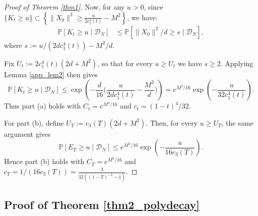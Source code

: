\documentclass[a4paper,11pt]{article}
\theoremstyle{plain}
\theoremstyle{definition}
\begin{document}
\begin{proof}[Proof of Theorem \ref{thm1}]
Now, for any $u>0$, since $\{K_t \geq u\} \subset \left\{\|X_0\|^2 \geq \frac{u}{2c_1^4(t)} - M^2 \right\}$, we have:
\begin{align}
    \mathbb{P}[K_t \geq u \mid \mathcal{D}_N] &\leq \mathbb{P}[\|X_0\|^2/d \geq s \mid \mathcal{D}_N], 
\end{align}
where $s := u/(2dc_1^4(t)) - M^2/d$.

Fix $U_t := 2c_1^4(t)(2d+M^2)$, so that for every $u\ge U_t$ we have $s \ge 2$. Applying Lemma \ref{app_lem2} then gives
\[
\mathbb{P}[K_t \ge u \mid \mathcal{D}_N] \le \exp\!\left(-\frac{d}{16}\Big(\frac{u}{2dc_1^4(t)}-\frac{M^2}{d}\Big)\right)
= e^{M^2/16}\exp\!\left(-\frac{u}{32c_1^4(t)}\right).
\]
Thus part (a) holds with $C_t=e^{M^2/16}$ and $c_t=(1-t)^4/32$.

For part (b), define $U_T := c_3(T)(2d+M^2)$. Then, for every $u\ge U_T$, the same argument gives
\[
\mathbb{P}[E_T \ge u \mid \mathcal{D}_N] \le e^{M^2/16}\exp\!\left(-\frac{u}{16c_3(T)}\right).
\]
Hence part (b) holds with $C_T=e^{M^2/16}$ and $c_T = 1/(16 c_3(T)) = \frac{3}{32((1-T)^{-3} - 1)}$.
\end{proof}

\subsection{Proof of Theorem \ref{thm2_polydecay}}
\end{document}
